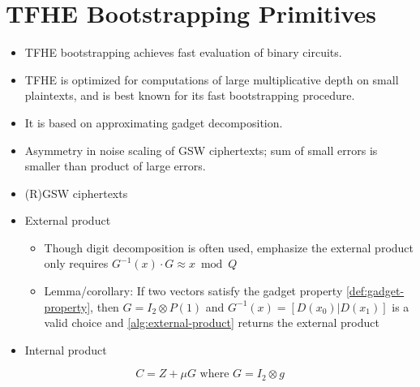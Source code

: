 \section{TFHE Bootstrapping Primitives}
\begin{itemize}
    \item TFHE bootstrapping achieves fast evaluation of binary circuits. 
    \item TFHE is optimized for computations of large multiplicative depth on small plaintexts, and is best known for its fast bootstrapping procedure.
    \item It is based on approximating gadget decomposition. 
    \item Asymmetry in noise scaling of GSW ciphertexts; sum of small errors is smaller than product of large errors.
\end{itemize}

\begin{itemize}
    \item (R)GSW ciphertexts \cite{cryptoeprint:2013/340, cryptoeprint:2014/816}
    \item External product \cite{cryptoeprint:2014/816, cryptoeprint:2018/421}
    \begin{itemize}
        \item Though digit decomposition is often used, emphasize the external product only requires $G^{-1}(x)\cdot G \approx x\bmod{Q}$
        \item Lemma/corollary: If two vectors satisfy the gadget property \eqref{def:gadget-property}, then $G = I_2\otimes P(1)$ and $G^{-1}(x) = [D(x_0)|D(x_1)]$ is a valid choice and \autoref{alg:external-product} returns the external product
    \end{itemize}
    \item Internal product \cite{cryptoeprint:2018/421}
\end{itemize}

\begin{definition}
    \cite{cryptoeprint:2013/340, cryptoeprint:2014/816, cryptoeprint:2018/421}
    \begin{equation}
        \label{def:rgsw}
        C = Z + \mu G \text{ where } G = I_2\otimes g
    \end{equation}
\end{definition}

